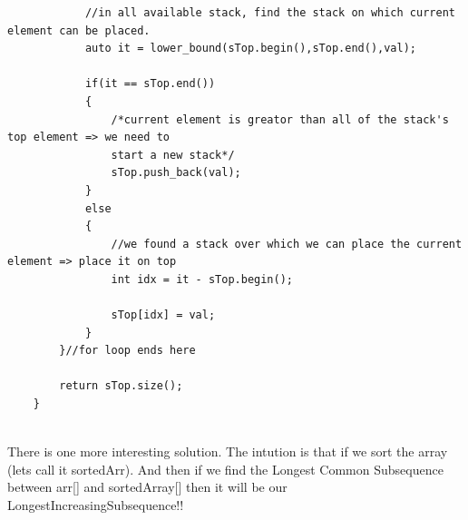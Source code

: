 \begin{solution}
\begin{verbatim}
            //in all available stack, find the stack on which current element can be placed. 
            auto it = lower_bound(sTop.begin(),sTop.end(),val); 

            if(it == sTop.end())
            {
                /*current element is greator than all of the stack's top element => we need to 
                start a new stack*/
                sTop.push_back(val);
            }
            else
            {
                //we found a stack over which we can place the current element => place it on top
                int idx = it - sTop.begin();
            
                sTop[idx] = val; 
            }
        }//for loop ends here
        
        return sTop.size();
    }
    
    \end{verbatim}
\end{solution}

\begin{solution}
    There is one more interesting solution.
    The intution is that if we sort the array (lets call it sortedArr). And then if we find the Longest Common Subsequence
    between arr[] and sortedArray[] then it will be our LongestIncreasingSubsequence!!
\end{solution}

